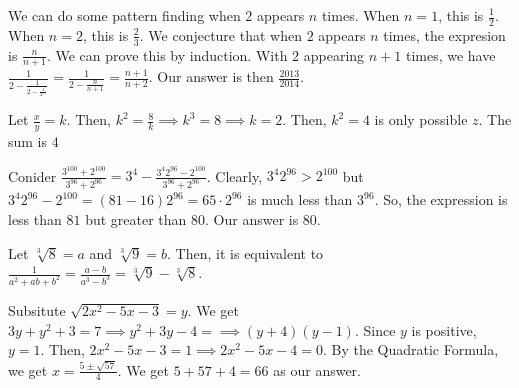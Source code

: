 \documentclass[11pt]{article}
\begin{document}

\begin{sol}
We can do some pattern finding when $2$ appears $n$ times. When $n=1$, this is $\frac{1}{2}$. When $n=2$, this is $\frac{2}{3}$. We conjecture that when $2$ appears $n$ times, the expresion is $\frac{n}{n+1}$. We can prove this by induction. With $2$ appearing $n+1$ times, we have $\frac{1}{2-\frac{1}{2-\frac{1}{2\cdots}}} = \frac{1}{2-\frac{n}{n+1}}=\frac{n+1}{n+2}$. Our answer is then $\boxed{\frac{2013}{2014}}$.
\end{sol}


\begin{sol} 
Let $\frac{x}{y}=k$. Then, $k^2=\frac{8}{k}\implies k^3 = 8\implies k =2$. Then, $k^2=4$ is only possible $z$. The sum is $\boxed{4}$ 
\end{sol}


\begin{sol}
Conider $\frac{3^{100}+2^{100}}{3^{96}+2^{96}}=3^4-\frac{3^{4}2^{96}-2^{100}}{3^{96}+2^{96}}$. Clearly, $3^{4}2^{96}>2^{100}$ but $3^{4}2^{96}-2^{100}=(81-16)2^{96}=65\cdot 2^{96}$ is much less than $3^{96}$. So, the expression is less than $81$ but greater than $80$. Our answer is $\boxed{80}$.
\end{sol}


\begin{sol}
Let $\sqrt[3]{8}=a$ and $\sqrt[3]{9}=b$. Then, it is equivalent to $\frac{1}{a^2+ab+b^2}=\frac{a-b}{a^3-b^3}=\boxed{\sqrt[3]{9}-\sqrt[3]{8}}$.
\end{sol}


\begin{sol}
Subsitute $\sqrt{2x^2-5x-3}=y$. We get $3y+y^2+3=7\implies y^2+3y-4=\implies (y+4)(y-1)$. Since $y$ is positive, $y=1$. Then, $2x^2-5x-3=1\implies 2x^2-5x-4=0$. By the Quadratic Formula, we get $x=\frac{5 \pm \sqrt{57}}{4}$. We get $5+57+4=\boxed{66}$ as our answer.
\end{sol}
\end{document}
